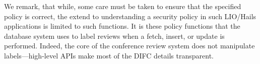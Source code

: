 We remark, that while, some care must be taken to ensure that the
specified policy is correct, the extend to understanding a security
policy in such LIO/Hails applications is limited to such functions.
%
It is these policy functions that the database system uses to label
reviews when a fetch, insert, or update is performed.
%
Indeed, the core of the conference review system does not manipulate
labels---high-level APIs make most of the DIFC details transparent.


